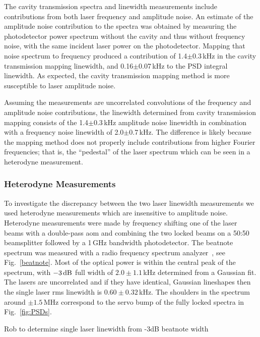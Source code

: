 The cavity transmission spectra and linewidth measurements include contributions from both laser frequency and amplitude noise.  An estimate of the amplitude noise contribution to the spectra was obtained by measuring the photodetector power spectrum without the cavity and thus without frequency noise, with the same incident laser power on the photodetector.  Mapping that noise spectrum to frequency produced a contribution of 1.4$\pm$0.3\,kHz in the cavity transmission mapping linewidth,  and 0.16$\pm$0.07\,kHz to the PSD integral linewidth.  As expected, the cavity transmission mapping method is more susceptible to laser amplitude noise. 

Assuming the measurements are uncorrelated convolutions of the frequency and amplitude noise contributions, the linewidth determined from cavity transmission mapping consists of the 1.4$\pm$0.3\,kHz amplitude noise linewidth in combination with a frequency noise linewidth of 2.0$\pm$0.7\,kHz.  The difference is likely because the mapping method does not properly include contributions from higher Fourier frequencies; that is, the ``pedestal'' of the laser spectrum which can be seen in a heterodyne measurement.

\subsubsection{Heterodyne Measurements}
To investigate the discrepancy between the two laser linewidth measurements we used heterodyne measurements which are insensitive to amplitude noise.
Heterodyne measurements were made by frequency shifting one of the laser beams with a double-pass \gls*{aom} and combining the two locked beams on a 50:50 beamsplitter followed by a 1\,GHz bandwidth photodetector. The beatnote spectrum was measured with a radio frequency spectrum analyzer~\cite{equipment}, see Fig.~\ref{beatnote}. Most of the optical power is within the central peak of the spectrum, with $-3\rm\,dB$ full width of $2.0\pm1.1$\,kHz determined from a Gaussian fit. The lasers are uncorrelated and if they have identical, Gaussian lineshapes then the single laser \gls*{rms} linewidth is $0.60\pm0.32$\,kHz. The shoulders in the spectrum around $\pm1.5$\,MHz correspond to the servo bump of the fully locked spectra in Fig.~\ref{fig:PSDs}.

{\color{red} Rob to determine single laser linewidth from -3dB beatnote width}

